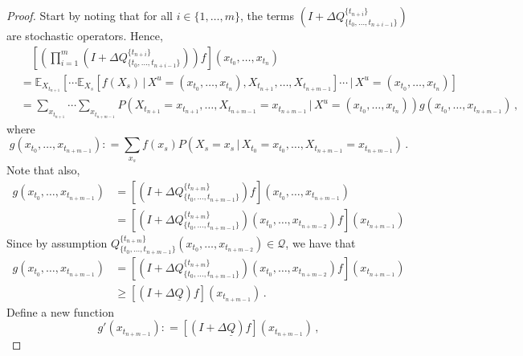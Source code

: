 \documentclass[a4paper,reqno]{amsart}
\newcommand{\lrate}{\underline{Q}}
\newcommand{\coloneqq}{:\!=}
\begin{document}
\begin{proof}
Start by noting that for all $i\in\{1,\ldots,m\}$, the terms $\left(I + \Delta Q_{\{t_0,\ldots,t_{n+i-1}\}}^{\{t_{n+i}\}}\right)$ are stochastic operators. Hence,
\begin{align*}
&\quad \left[\left(\prod_{i=1}^m \left(I + \Delta Q_{\{t_0,\ldots,t_{n+i-1}\}}^{\{t_{n+i}\}} \right)\right)f\right](x_{t_0},\ldots,x_{t_n}) \\
&= \mathbb{E}_{X_{t_{n+1}}}\left[\cdots\mathbb{E}_{X_s}\left[f(X_s)\,\vert\,X^u=(x_{t_0},\ldots,x_{t_n}),X_{t_{n+1}},\ldots,X_{t_{n+m-1}}\right]\cdots\,\vert\,X^u=(x_{t_0},\ldots,x_{t_n})\right] \\
&= \sum_{x_{t_{n+1}}}\cdots\sum_{x_{t_{n+m-1}}} P\left(X_{t_{n+1}}=x_{t_{n+1}},\ldots,X_{t_{n+m-1}}=x_{t_{n+m-1}}\,\vert\,X^u=(x_{t_0},\ldots,x_{t_n})\right)g(x_{t_0},\ldots,x_{t_{n+m-1}})\,,
\end{align*}
where
\begin{equation*}
g(x_{t_0},\ldots,x_{t_{n+m-1}}) \coloneqq \sum_{x_s}f(x_s)P\left(X_s=x_s\,\vert\,X_{t_0}=x_{t_0},\ldots,X_{t_{n+m-1}}=x_{t_{n+m-1}}\right)\,.
\end{equation*}
Note that also,
\begin{align*}
g(x_{t_0},\ldots,x_{t_{n+m-1}}) &= \left[\left(I+\Delta Q_{\{t_0,\ldots,t_{n+m-1}\}}^{\{t_{n+m}\}}\right)f\right](x_{t_0},\ldots,x_{t_{n+m-1}}) \\
 &= \left[\left(I+\Delta Q_{\{t_0,\ldots,t_{n+m-1}\}}^{\{t_{n+m}\}}\right)(x_{t_0},\ldots,x_{t_{n+m-2}})f\right](x_{t_{n+m-1}})
\end{align*}
Since by assumption $Q_{\{t_0,\ldots,t_{n+m-1}\}}^{\{t_{n+m}\}}(x_{t_0},\ldots,x_{t_{n+m-2}})\in\mathcal{Q}$, we have that
\begin{align*}
g(x_{t_0},\ldots,x_{t_{n+m-1}}) &= \left[\left(I+\Delta Q_{\{t_0,\ldots,t_{n+m-1}\}}^{\{t_{n+m}\}}\right)(x_{t_0},\ldots,x_{t_{n+m-2}})f\right](x_{t_{n+m-1}})\\
 &\geq \left[\left(I + \Delta\lrate\right)f\right](x_{t_{n+m-1}})\,.
\end{align*}
Define a new function
\begin{equation*}
g'(x_{t_{n+m-1}}) \coloneqq \left[\left(I + \Delta\lrate\right)f\right](x_{t_{n+m-1}})\,,

\end{equation*}
\end{proof}
\end{document}
